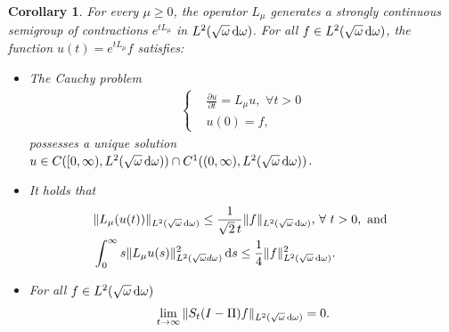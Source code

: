 \documentclass[reqno,11pt,letterpaper]{amsart}
\numberwithin{equation}{section}
\newcommand{\dd}{\, {\rm d}}
\newtheorem{corollary}[proposition]{Corollary}
\begin{document}
\begin{corollary} \label{cor: decay_contr}
For every $\mu \ge 0$, the operator $L_\mu$ generates a strongly continuous semigroup of contractions $e^{t L_\mu}$ in $L^2(\sqrt{\omega} \dd \omega)$. For all $f\in L^2(\sqrt{\omega} \dd \omega)$, the function $u(t)=e^{t L_\mu}f$ satisfies:
\begin{itemize}
    \item[(i)] The Cauchy problem 
    \begin{align*}
\begin{cases}
&\frac{\partial u}{\partial t}=L_{\mu} u,\,\,\forall t>0\\
&u(0)=f, 
\end{cases}
\end{align*}
possesses a unique solution $u\in C([0, \infty),L^2(\sqrt{\omega} \dd \omega))\cap C^1((0,\infty),L^2(\sqrt{\omega} \dd \omega)) $.  
\item[(ii)] It holds that
\begin{align*}
&\| L_\mu(u(t))\|_{L^2(\sqrt{\omega} \dd \omega)} \le \frac{1}{\sqrt 2\, t} \|f\|_{L^2(\sqrt{\omega} \dd \omega)},\,\forall\ t>0, \text{ and } \\
&\int_0^{\infty} s \| L_ \mu u(s)\|^2 _{ L^2(\sqrt \omega d\omega ) }\dd s\le
 \frac{1}{4}\| f \|^2_{ L^2(\sqrt \omega \dd\omega ) }.
 \end{align*}
\item[(iii)] For all $f\in L^2(\sqrt{\omega} \dd \omega)$
 \begin{align*}
\lim _{ t\to \infty } \|S_t(I-\Pi)f \|_{L^2(\sqrt{\omega} \dd\omega )}=0.
\end{align*}
\end{itemize}
\end{corollary}
\end{document}
